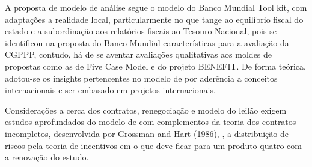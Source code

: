 A proposta de modelo de análise segue o modelo do Banco Mundial Tool kit, com adaptações a realidade local, particularmente no que tange ao equilíbrio fiscal do estado e a subordinação aos relatórios fiscais ao Tesouro Nacional, pois se identificou na proposta do Banco Mundial características para a avaliação da CGPPP, contudo, há de se aventar avaliações qualitativas aos moldes de propostas como as de Five Case Model e do projeto BENEFIT. De forma teórica, adotou-se os insights pertencentes no modelo de  por aderência a conceitos internacionais e ser embasado em projetos internacionais.

Considerações a cerca dos contratos, renegociação e modelo do leilão exigem estudos aprofundados do modelo de  com complementos da teoria dos contratos incompletos, desenvolvida por Grossman and Hart (1986), ,  a distribuição de riscos pela teoria de incentivos em  o que deve ficar para um produto quatro com a renovação do estudo.


